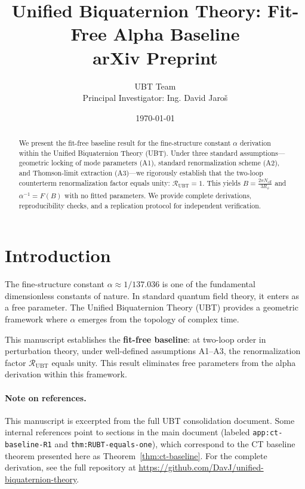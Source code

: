 \documentclass[11pt,a4paper]{article}
\title{Unified Biquaternion Theory: Fit-Free Alpha Baseline\\
\large arXiv Preprint}
\author{UBT Team\\
Principal Investigator: Ing. David Jaroš}
\date{\today}
\begin{document}
\maketitle

\begin{abstract}
We present the fit-free baseline result for the fine-structure constant $\alpha$ derivation within the Unified Biquaternion Theory (UBT). Under three standard assumptions—geometric locking of mode parameters (A1), standard renormalization scheme (A2), and Thomson-limit extraction (A3)—we rigorously establish that the two-loop counterterm renormalization factor equals unity: $\mathcal{R}_{\mathrm{UBT}} = 1$. This yields $B = \frac{2\pi N_{\mathrm{eff}}}{3R_\psi}$ and $\alpha^{-1} = F(B)$ with no fitted parameters. We provide complete derivations, reproducibility checks, and a replication protocol for independent verification.
\end{abstract}

\tableofcontents

\section{Introduction}

The fine-structure constant $\alpha \approx 1/137.036$ is one of the fundamental dimensionless constants of nature. In standard quantum field theory, it enters as a free parameter. The Unified Biquaternion Theory (UBT) provides a geometric framework where $\alpha$ emerges from the topology of complex time.

This manuscript establishes the \textbf{fit-free baseline}: at two-loop order in perturbation theory, under well-defined assumptions A1--A3, the renormalization factor $\mathcal{R}_{\mathrm{UBT}}$ equals unity. This result eliminates free parameters from the alpha derivation within this framework.

\paragraph{Note on references.} This manuscript is excerpted from the full UBT consolidation document. Some internal references point to sections in the main document (labeled \texttt{app:ct-baseline-R1} and \texttt{thm:RUBT-equals-one}), which correspond to the CT baseline theorem presented here as Theorem~\ref{thm:ct-baseline}. For the complete derivation, see the full repository at \url{https://github.com/DavJ/unified-biquaternion-theory}.
\end{document}
